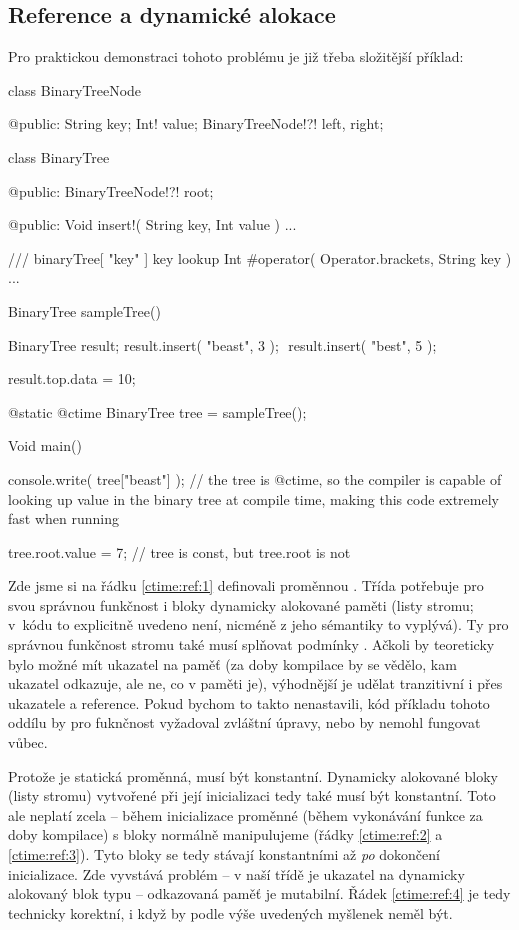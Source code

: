 \subsection{Reference a dynamické alokace} \label{ctime:ref}
Pro praktickou demonstraci tohoto problému je již třeba složitější příklad:
\begin{code}
class BinaryTreeNode {
	
@public:
	String key;
	Int! value;
	BinaryTreeNode!?! left, right;
	
}
	
class BinaryTree {

@public:
	BinaryTreeNode!?! root;
	
@public:
	Void insert!( String key, Int value ) { ... }
	
	/// binaryTree[ "key" ] key lookup
	Int #operator( Operator.brackets, String key ) { ... }

}

BinaryTree sampleTree() {
	BinaryTree result;
	result.insert( "beast", 3 ); $\label{ctime:ref:2}$
	result.insert( "best", 5 ); $\label{ctime:ref:3}$
	
	result.top.data = 10;
}

@static @ctime BinaryTree tree = sampleTree(); $\label{ctime:ref:1}$

Void main() {
	console.write( tree["beast"] ); // the tree is @ctime, so the compiler is capable of looking up value in the binary tree at compile time, making this code extremely fast when running
	
	tree.root.value = 7; // tree is const, but tree.root is not $\label{ctime:ref:4}$
}
\end{code}

Zde jsme si na řádku \ref{ctime:ref:1} definovali \ctime proměnnou .  Třída  potřebuje pro svou správnou funkčnost i bloky dynamicky alokované paměti (listy stromu; v~kódu to explicitně uvedeno není, nicméně z jeho sémantiky to vyplývá). Ty pro správnou funkčnost stromu také musí splňovat podmínky \ctime. Ačkoli by teoreticky bylo možné mít \ctime ukazatel na \nonctime paměť (za doby kompilace by se vědělo, kam ukazatel odkazuje, ale ne, co v paměti je), výhodnější je udělat \ctime tranzitivní i přes ukazatele a reference. Pokud bychom to takto nenastavili, kód příkladu tohoto oddílu by pro fuknčnost vyžadoval zvláštní úpravy, nebo by nemohl fungovat vůbec.

Protože  je statická \ctime proměnná, musí být konstantní. Dynamicky alokované bloky (listy stromu) vytvořené při její inicializaci tedy také musí být konstantní. Toto ale neplatí zcela -- během inicializace proměnné  (během vykonávání funkce  za doby kompilace) s bloky normálně manipulujeme (řádky \ref{ctime:ref:2} a \ref{ctime:ref:3}). Tyto bloky se tedy stávají konstantními až \textit{po} dokončení inicializace. Zde vyvstává problém -- v naší třídě  je ukazatel na dynamicky alokovaný blok typu  -- odkazovaná paměť je mutabilní. Řádek \ref{ctime:ref:4} je tedy technicky korektní, i když by podle výše uvedených myšlenek neměl být.

